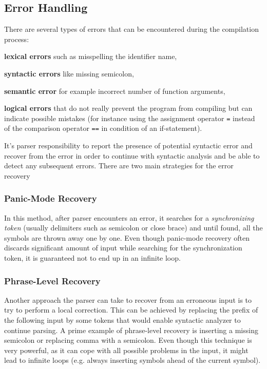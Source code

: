 \documentclass[
  digital, %
  table,   %
  lof,     %
  lot,     %
  oneside,
]{fithesis3}
\begin{document}
  \subsection{Error Handling}
There are several types of errors that can be encountered during the compilation process:
\begin{compactitem}
  \item\textbf{lexical errors} such as misspelling the identifier name,
  \item\textbf{syntactic errors} like missing semicolon,
  \item\textbf{semantic error} for example incorrect number of function arguments,
  \item\textbf{logical errors} that do not really prevent the program from compiling but can indicate possible mistakes (for instance using the assignment operator \texttt{=} instead of the comparison operator \texttt{==} in condition of an if-statement).
\end{compactitem} 

It's parser responsibility to report the presence of potential syntactic error and recover from the error in order to continue with syntactic analysis and be able to detect any subsequent errors. There are two main strategies for the error recovery~\cite{dragon-book}

  \subsubsection{Panic-Mode Recovery}
In this method, after parser encounters an error, it searches for a \textit{synchronizing token} (usually delimiters such as semicolon or close brace) and until found, all the symbols are thrown away one by one. Even though panic-mode recovery often discards significant amount of input while searching for the synchronization token, it is guaranteed not to end up in an infinite loop.

  \subsubsection{Phrase-Level Recovery}
Another approach the parser can take to recover from an erroneous input is to try to perform a local correction. This can be achieved by replacing the prefix of the following input by some tokens that would enable syntactic analyzer to continue parsing. A prime example of phrase-level recovery is inserting a missing semicolon or replacing comma with a semicolon. Even though this technique is very powerful, as it can cope with all possible problems in the input, it might lead to infinite loops (e.g. always inserting symbols ahead of the current symbol).
\end{document}
